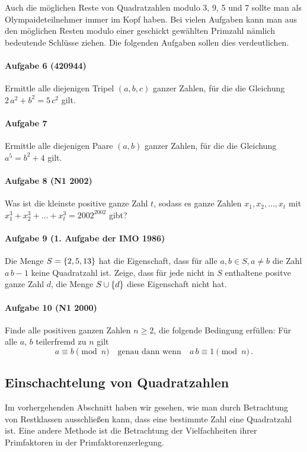 \documentclass[11pt,a4paper]{article}
\begin{document}
Auch die möglichen Reste von Quadratzahlen modulo 3, 9, 5 und 7 sollte man als
Olympaideteilnehmer immer im Kopf haben. Bei vielen Aufgaben kann man aus den
möglichen Resten modulo einer geschickt gewählten Primzahl nämlich bedeutende
Schlüsse ziehen. Die folgenden Aufgaben sollen dies verdeutlichen.

\paragraph{Aufgabe 6 (420944)} 
Ermittle alle diejenigen Tripel $(a,b,c)$ ganzer Zahlen, für die die Gleichung
$2\,a^{2}+b^{2}=5\,c^{2}$ gilt.

\paragraph{Aufgabe 7} 
Ermittle alle diejenigen Paare $(a,b)$ ganzer Zahlen, für die die Gleichung
$a^{5}=b^{2}+4$ gilt.

\paragraph{Aufgabe 8  (N1 2002)} 
Was ist die kleinste positive ganze Zahl $t$, sodass es ganze Zahlen $x_{1},
x_{2},\dots,x_{t}$ mit $x_{1}^{3}+x_{2}^{3}+\dots+x_{t}^{3}=2002^{2002}$ gibt?

\paragraph{Aufgabe 9  (1. Aufgabe der IMO 1986)} 
Die Menge $S=\left\{2,5,13\right\}$ hat die Eigenschaft, dass für alle $a,b\in S, a\neq
b$ die Zahl $a\,b-1$ keine Quadratzahl ist. Zeige, dass für jede nicht in $S$
enthaltene positve ganze Zahl $d$, die Menge $S\cup \left\{d\right\}$ diese Eigenschaft
nicht hat.

\paragraph{Aufgabe 10  (N1 2000)} 
Finde alle positiven ganzen Zahlen $n\geq 2$, die folgende Bedingung erfüllen:
Für alle $a$, $b$ teilerfremd zu $n$ gilt
\[a\equiv b\pmod{n}\quad \text{genau dann wenn}\quad a\,b\equiv 1\pmod{n}\,.\] 

\subsection*{Einschachtelung von Quadratzahlen}

Im vorhergehenden Abschnitt haben wir gesehen, wie man durch Betrachtung von
Restklassen ausschließen kann, dass eine bestimmte Zahl eine Quadratzahl ist.
Eine andere Methode ist die Betrachtung der Vielfachheiten ihrer Primfaktoren
in der Primfaktorenzerlegung.
\end{document}
